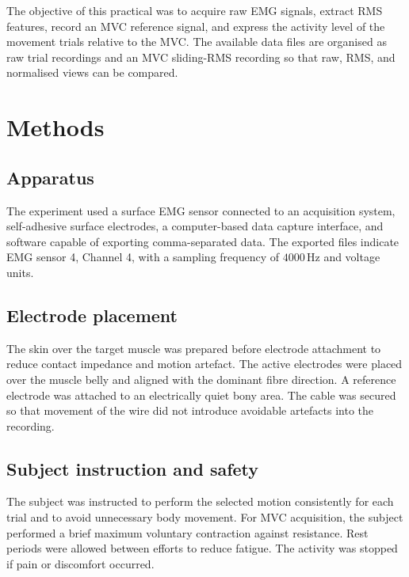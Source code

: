 \documentclass[12pt,a4paper]{article}
\begin{document}
The objective of this practical was to acquire raw EMG signals, extract RMS
features, record an MVC reference signal, and express the activity level of the
movement trials relative to the MVC. The available data files are organised as
raw trial recordings and an MVC sliding-RMS recording so that raw, RMS, and
normalised views can be compared.

\section{Methods}
\subsection{Apparatus}
The experiment used a surface EMG sensor connected to an acquisition system,
self-adhesive surface electrodes, a computer-based data capture interface, and
software capable of exporting comma-separated data. The exported files indicate
EMG sensor 4, Channel 4, with a sampling frequency of $4000\,\mathrm{Hz}$ and
voltage units.

\subsection{Electrode placement}
The skin over the target muscle was prepared before electrode attachment to
reduce contact impedance and motion artefact. The active electrodes were placed
over the muscle belly and aligned with the dominant fibre direction. A reference
electrode was attached to an electrically quiet bony area. The cable was secured
so that movement of the wire did not introduce avoidable artefacts into the
recording.

\subsection{Subject instruction and safety}
The subject was instructed to perform the selected motion consistently for each
trial and to avoid unnecessary body movement. For MVC acquisition, the subject
performed a brief maximum voluntary contraction against resistance. Rest periods
were allowed between efforts to reduce fatigue. The activity was stopped if pain
or discomfort occurred.
\end{document}
